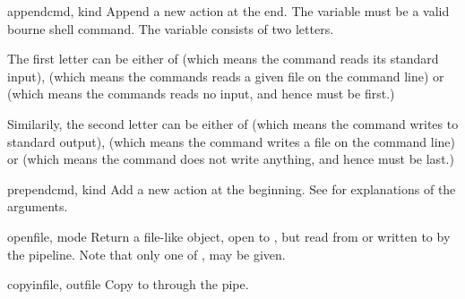 \begin{methoddesc}{append}{cmd, kind}
Append a new action at the end. The  variable must be a valid
bourne shell command. The  variable consists of two letters.

The first letter can be either of  (which means the command
reads its standard input),  (which means the commands reads
a given file on the command line) or  (which means the commands
reads no input, and hence must be first.)

Similarily, the second letter can be either of  (which means 
the command writes to standard output),  (which means the 
command writes a file on the command line) or  (which means
the command does not write anything, and hence must be last.)
\end{methoddesc}

\begin{methoddesc}{prepend}{cmd, kind}
Add a new action at the beginning. See  for explanations
of the arguments.
\end{methoddesc}

\begin{methoddesc}{open}{file, mode}
Return a file-like object, open to , but read from or
written to by the pipeline.  Note that only one of ,
 may be given.
\end{methoddesc}

\begin{methoddesc}{copy}{infile, outfile}
Copy  to  through the pipe.
\end{methoddesc}
